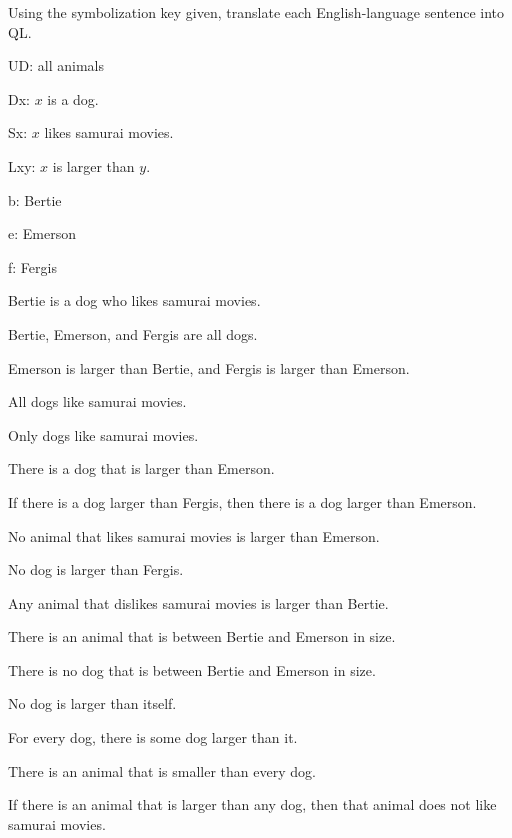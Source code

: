 \problempart Using the symbolization key given, translate each English-language sentence into QL.
\begin{ekey}
\item[UD:] all animals
\item[Dx:] $x$ is a dog.
\item[Sx:] $x$ likes samurai movies.
\item[Lxy:] $x$ is larger than $y$.
\item[b:] Bertie
\item[e:] Emerson
\item[f:] Fergis
\end{ekey}
\begin{earg}
\item Bertie is a dog who likes samurai movies.
\item Bertie, Emerson, and Fergis are all dogs.
\item Emerson is larger than Bertie, and Fergis is larger than Emerson.
\item All dogs like samurai movies.
\item Only dogs like samurai movies.
\item There is a dog that is larger than Emerson.
\item If there is a dog larger than Fergis, then there is a dog larger than Emerson.
\item No animal that likes samurai movies is larger than Emerson.
\item No dog is larger than Fergis.
\item Any animal that dislikes samurai movies is larger than Bertie.
\item There is an animal that is between Bertie and Emerson in size.
\item There is no dog that is between Bertie and Emerson in size.
\item No dog is larger than itself.
\item For every dog, there is some dog larger than it.
\item There is an animal that is smaller than every dog.
\item If there is an animal that is larger than any dog, then that animal does not like samurai movies.
\end{earg}


